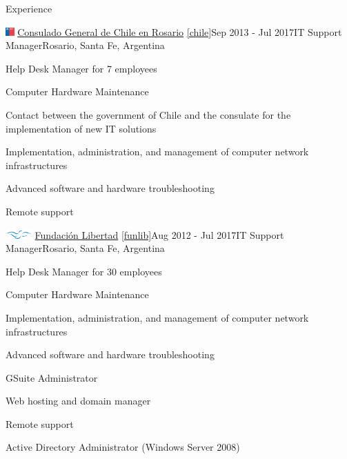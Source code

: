 \documentclass{resume} %
\begin{document}
\begin{rSection}{Experience}
    \begin{rSubsection}{\includegraphics[height=0.3cm]{images/minrel-chile.png} \href{https://chile.gob.cl/rosario/}{Consulado General de Chile en Rosario} \ref{chile}}{Sep 2013 - Jul 2017}{IT Support Manager}{Rosario, Santa Fe, Argentina}

        \item Help Desk Manager for 7 employees
        \item Computer Hardware Maintenance
        \item Contact between the government of Chile and the consulate for the implementation of new IT solutions
        \item Implementation, administration, and management of computer network infrastructures
        \item Advanced software and hardware troubleshooting
        \item Remote support

    \end{rSubsection}


    \begin{rSubsection}{\includegraphics[height=0.3cm]{images/fl.png} \href{https://libertad.org.ar/}{Fundación Libertad} \ref{funlib}}{Aug 2012 - Jul 2017}{IT Support Manager}{Rosario, Santa Fe, Argentina}

        \item Help Desk Manager for 30 employees
        \item Computer Hardware Maintenance
        \item Implementation, administration, and management of computer network infrastructures
        \item Advanced software and hardware troubleshooting
        \item GSuite Administrator
        \item Web hosting and domain manager
        \item Remote support
        \item Active Directory Administrator (Windows Server 2008)

    \end{rSubsection}


\end{rSection}
\end{document}
